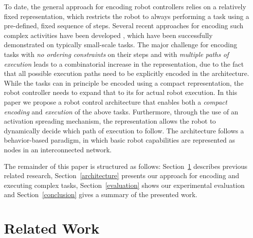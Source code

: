 \documentclass[letterpaper, 10 pt, conference]{ieeeconf}  %
\begin{document}
To date, the general approach for encoding robot controllers relies on a relatively fixed representation, which restricts the robot to always performing a task using a pre-defined, fixed sequence of steps. Several recent approaches for encoding such complex activities have been developed \cite{koppula2013anticipating}\cite{hawkins2014anticipating}, which have been successfully demonstrated on typically small-scale tasks. The major challenge for encoding tasks with {\it no ordering constraints} on their steps and with {\it multiple paths of execution} leads to a combinatorial increase in the representation, due to the fact that all possible execution paths need to be explicitly encoded in the architecture. While the tasks can in principle be encoded using a compact representation, the robot controller needs to expand that to its for actual robot execution. In this paper we propose a robot control architecture that enables both a {\it compact encoding} and {\it execution} of the above tasks. Furthermore, through the use of an activation spreading mechanism, the representation allows the robot to dynamically decide which path of execution to follow. The architecture follows a behavior-based paradigm, in which basic robot capabilities are represented as nodes in an interconnected network. 

The remainder of this paper is structured as follows: Section~\ref{relatedWork} describes previous related research, Section~\ref{architecture} presents our approach for encoding and executing complex tasks, Section~\ref{evaluation} shows our experimental evaluation and Section~\ref{conclusion} gives a summary of the presented work.

\section{Related Work}
\label{relatedWork}
\end{document}
